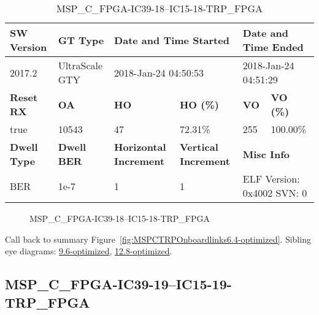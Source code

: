 \begin{table}[h]
\centering
\caption{MSP\_C\_FPGA-IC39-18--IC15-18-TRP\_FPGA}
\label{tab:MSPCFPGAIC3918IC1518TRPFPGA6.4-optimized}
\begin{tabular}{@{}|l|l|l|l|l|l|@{}}
\toprule
\textbf{SW Version}                & \textbf{GT Type}   & \multicolumn{2}{l|}{\textbf{Date and Time Started}}            & \multicolumn{2}{l|}{\textbf{Date and Time Ended}}        \\ \midrule
2017.2                       & UltraScale GTY          & \multicolumn{2}{l|}{2018-Jan-24 04:50:53}                   & \multicolumn{2}{l|}{2018-Jan-24 04:51:29}               \\ \midrule
\textbf{Reset RX}                  & \textbf{OA} & \textbf{HO}   & \textbf{HO (\%)} & \textbf{VO} & \textbf{VO (\%)} \\ \midrule
true & 10543        & 47          & 72.31\%        & 255        & 100.00\%       \\ \midrule
\textbf{Dwell Type}                & \textbf{Dwell BER} & \textbf{Horizontal Increment} & \textbf{Vertical Increment}    & \multicolumn{2}{l|}{\textbf{Misc Info}}                  \\ \midrule
BER                            & 1e-7        & 1        & 1           & \multicolumn{2}{l|}{ELF Version: 0x4002 SVN: 0}                         \\ \bottomrule
\end{tabular}
\end{table}

\begin{figure}[h]
\caption{MSP\_C\_FPGA-IC39-18--IC15-18-TRP\_FPGA} \label{fig:MSPCFPGAIC3918IC1518TRPFPGA6.4-optimized}
\end{figure}

Call back to summary Figure~\ref{fig:MSPCTRPOnboardlinks6.4-optimized}.
Sibling eye diagrams: \hyperref[sec:MSPCFPGAIC3918IC1518TRPFPGA9.6-optimized]{9.6-optimized}, \hyperref[sec:MSPCFPGAIC3918IC1518TRPFPGA12.8-optimized]{12.8-optimized}.

\clearpage
\newpage


\subsection{MSP\_C\_FPGA-IC39-19--IC15-19-TRP\_FPGA}\label{sec:MSPCFPGAIC3919IC1519TRPFPGA6.4-optimized}


